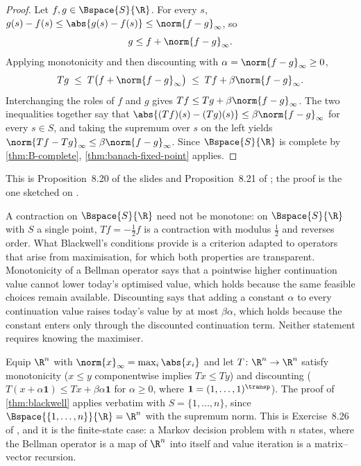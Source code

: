 \begin{proof}
	Let $f,g\in\Bspace{S}{\R}$. For every $s$,
	$g(s)-f(s)\leq\abs{g(s)-f(s)}\leq\norm{f-g}_\infty$, so
	\[
		g\leq f+\norm{f-g}_\infty .
	\]
	Applying monotonicity and then discounting with
	$\alpha=\norm{f-g}_\infty\geq0$,
	\[
		Tg\;\leq\;T\bigl(f+\norm{f-g}_\infty\bigr)\;\leq\;Tf+\beta\norm{f-g}_\infty .
	\]
	Interchanging the roles of $f$ and $g$ gives
	$Tf\leq Tg+\beta\norm{f-g}_\infty$. The two inequalities together say that
	$\abs{(Tf)(s)-(Tg)(s)}\leq\beta\norm{f-g}_\infty$ for every $s\in S$, and
	taking the supremum over $s$ on the left yields
	$\norm{Tf-Tg}_\infty\leq\beta\norm{f-g}_\infty$. Since $\Bspace{S}{\R}$ is
	complete by \autoref{thm:B-complete}, \autoref{thm:banach-fixed-point} applies.
\end{proof}

This is Proposition~8.20 of the slides and Proposition~8.21 of
\textcite[p.~289]{fukuda2026notes}; the proof is the one sketched on
\autocite[slide 76]{fukuda2026analysis}.

\begin{remark}\label{rem:blackwell-sufficient}
	A contraction on $\Bspace{S}{\R}$ need not be monotone: on
	$\Bspace{S}{\R}$ with $S$ a single point, $Tf=-\tfrac12f$ is a contraction with
	modulus $\tfrac12$ and reverses order. What Blackwell's conditions provide is a
	criterion adapted to operators that arise from maximisation, for which both
	properties are transparent. Monotonicity of a Bellman operator says that a
	pointwise higher continuation value cannot lower today's optimised value, which
	holds because the same feasible choices remain available. Discounting says that
	adding a constant $\alpha$ to every continuation value raises today's value by
	at most $\beta\alpha$, which holds because the constant enters only through the
	discounted continuation term. Neither statement requires knowing the maximiser.
\end{remark}

\begin{eg}[Blackwell in $\R^n$]\label{eg:blackwell-rn}
	Equip $\R^n$ with $\norm{x}_\infty=\max_i\abs{x_i}$ and let
	$T\colon\R^n\to\R^n$ satisfy monotonicity ($x\leq y$ componentwise implies
	$Tx\leq Ty$) and discounting ($T(x+\alpha\mathbf1)\leq Tx+\beta\alpha\mathbf1$
	for $\alpha\geq0$, where $\mathbf1=(1,\dots,1)^\transp$). The proof of
	\autoref{thm:blackwell} applies verbatim with $S=\{1,\dots,n\}$, since
	$\Bspace{\{1,\dots,n\}}{\R}=\R^n$ with the supremum norm. This is
	Exercise~8.26 of \textcite[p.~290]{fukuda2026notes}, and it is the finite-state
	case: a Markov decision problem with $n$ states, where the Bellman operator is a
	map of $\R^n$ into itself and value iteration is a matrix--vector recursion.
\end{eg}

